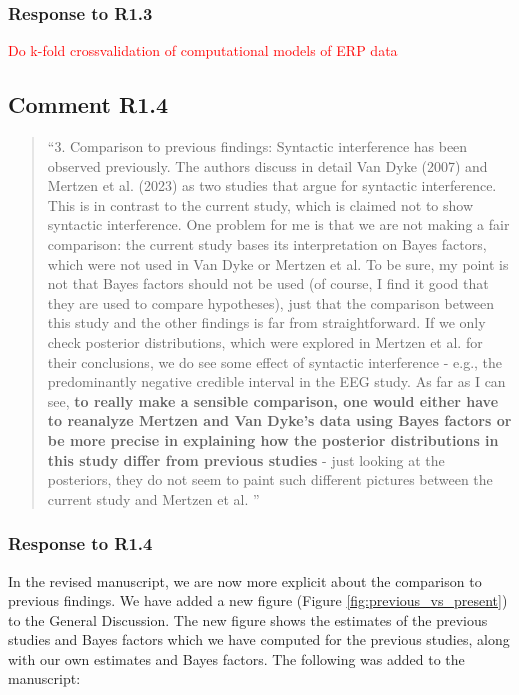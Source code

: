 \documentclass[12pt]{article}
\begin{document}
\subsubsection*{Response to R1.3}
\textcolor{red}{Do k-fold crossvalidation of computational models of ERP data}

\subsection*{Comment R1.4}
\begin{quote}
``3. Comparison to previous findings: Syntactic interference has been observed previously. The authors discuss in detail Van Dyke (2007) and Mertzen et al. (2023) as two studies that argue for syntactic interference. This is in contrast to the current study, which is claimed not to show syntactic interference. One problem for me is that we are not making a fair comparison: the current study bases its interpretation on Bayes factors, which were not used in Van Dyke or Mertzen et al. To be sure, my point is not that Bayes factors should not be used (of course, I find it good that they are used to compare hypotheses), just that the comparison between this study and the other findings is far from straightforward. If we only check posterior distributions, which were explored in Mertzen et al. for their conclusions, we do see some effect of syntactic interference - e.g., the predominantly negative credible interval in the EEG study. As far as I can see, \textbf{to really make a sensible comparison, one would either have to reanalyze Mertzen and Van Dyke's data using Bayes factors or be more precise in explaining how the posterior distributions in this study differ from previous studies} - just looking at the posteriors, they do not seem to paint such different pictures between the current study and Mertzen et al. ''\end{quote}

\subsubsection*{Response to R1.4}
In the revised manuscript, we are now more explicit about the comparison to previous findings. We have added a new figure (Figure \ref{fig:previous_vs_present}) to the General Discussion. The new figure shows the estimates of the previous studies and Bayes factors which we have computed for the previous studies, along with our own estimates and Bayes factors. The following was added to the manuscript:
\setcounter{figure}{11}
\end{document}
